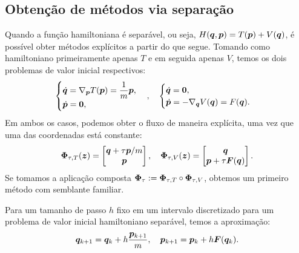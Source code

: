 \subsection{Obtenção de métodos via separação}
Quando a função hamiltoniana é separável, ou seja, $H(\bm q, \bm p) = T(\bm p) + V(\bm q)$, é possível obter métodos explícitos a partir do que segue. Tomando como hamiltoniano primeiramente apenas $T$ e em seguida apenas $V$, temos os dois problemas de valor inicial respectivos:
\begin{equation}
    \begin{cases}
        \dot {\bm q} = \nabla_{\bm p} T(\bm p) = \dfrac{1}{m} \bm p, \\
        \dot {\bm p} = \bm 0,
    \end{cases},
    \quad
    \begin{cases}
        \dot {\bm q} = \bm 0, \\
        \dot {\bm p} = - \nabla_{\bm q} V(\bm q) = F(\bm q).
    \end{cases}   
\end{equation}
Em ambos os casos, podemos obter o fluxo de maneira explícita, uma vez que uma das coordenadas está constante:
\begin{equation}
    \bm \Phi_{\tau, T} (\bm z) = \begin{bmatrix}
        \bm q + \tau \bm p/m \\ \bm p
    \end{bmatrix},
    \quad
    \bm \Phi_{\tau, V} (\bm z) = \begin{bmatrix}
        \bm q \\ \bm p + \tau \bm F(\bm q)
    \end{bmatrix}.
\end{equation}
Se tomamos a aplicação composta $\bm \Phi_{\tau} := \bm \Phi_{\tau, T} \circ \bm \Phi_{\tau, V}$, obtemos um primeiro método com semblante familiar.

\begin{method}\label{metodo:euler_simpletico}
    Para um tamanho de passo $h$ fixo em um intervalo discretizado para um problema de valor inicial hamiltoniano separável, temos a aproximação:
    \begin{equation}
        \bm q_{k+1} = \bm q_k + h \dfrac{\bm p_{k+1}}{m},
        \quad
        \bm p_{k+1} = \bm p_k + h \bm F(\bm q_k).
    \end{equation}
\end{method}

